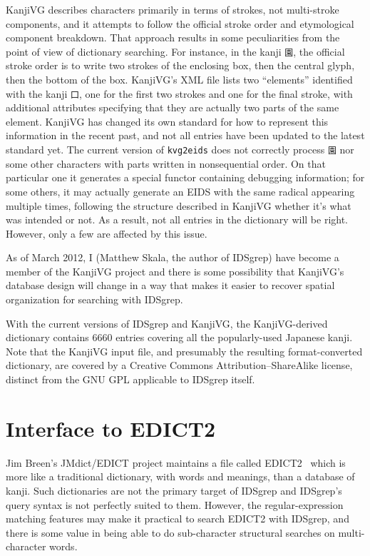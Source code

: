 \documentclass[twocolumn]{report}
\begin{document}
KanjiVG describes characters primarily in terms of strokes, not multi-stroke
components, and it attempts to follow the official stroke order and
etymological component breakdown.  That approach results in some
peculiarities from the point of view of dictionary searching.  For instance,
in the kanji \texttt{園}, the official stroke order is to write two strokes
of the enclosing box, then the central glyph, then the bottom of the box. 
KanjiVG's XML file lists two ``elements'' identified with the kanji
\texttt{囗}, one for the first two strokes and one for the final stroke,
with additional attributes specifying that they are actually two parts of
the same element.  KanjiVG has changed its own standard for how to represent
this information in the recent past, and not all entries have been updated
to the latest standard yet.  The current version of \texttt{kvg2eids} does
not correctly process \texttt{園} nor some other characters with parts
written in nonsequential order.  On that particular one it generates a
special functor containing debugging information; for some others, it may
actually generate an EIDS with the same radical appearing multiple times,
following the structure described in KanjiVG whether it's what was intended
or not.  As a result, not all entries in the dictionary will be right. 
However, only a few are affected by this issue.

As of March 2012, I (Matthew Skala, the author of IDSgrep) have become a
member of the KanjiVG project and there is some possibility that KanjiVG's
database design will change in a way that makes it easier to recover spatial
organization for searching with IDSgrep.

With the current versions of IDSgrep and KanjiVG, the KanjiVG-derived
dictionary contains 6660 entries covering all the popularly-used Japanese
kanji.  Note that the KanjiVG input file, and presumably the resulting
format-converted dictionary, are covered by a Creative Commons
Attribution--ShareAlike license, distinct from the GNU GPL applicable to
IDSgrep itself.


\section{Interface to EDICT2}

Jim Breen's JMdict/EDICT project maintains a file called
EDICT2~\cite{EDICT2} which is more like a traditional dictionary, with
words and meanings, than a database of kanji.  Such dictionaries are
not the primary target of IDSgrep and IDSgrep's query syntax is not
perfectly suited to them.  However, the regular-expression matching
features may make it practical to search EDICT2 with IDSgrep, and
there is some value in being able to do sub-character structural
searches on multi-character words.
\end{document}
